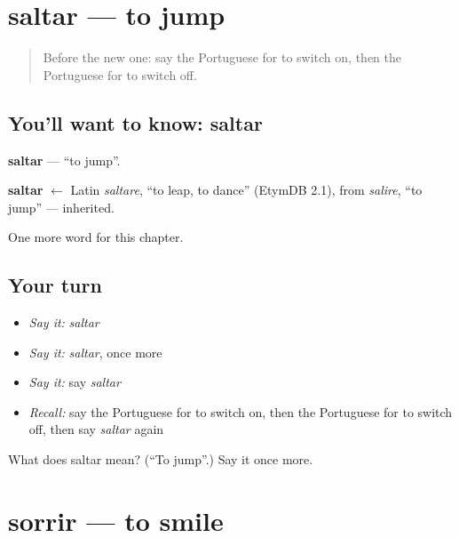 \section[saltar]{saltar — to jump}

\label{lesson:PT-C138-saltar}



\begin{quote}
Before the new one: say the Portuguese for to switch on, then the Portuguese for to switch off.
\end{quote}

\subsection*{You'll want to know: saltar}
\textbf{saltar} — \textquotedblleft{}to jump\textquotedblright{}.

\begin{cousinweb}
\textbf{saltar} $\leftarrow$ Latin \emph{saltare}, \textquotedblleft{}to leap, to dance\textquotedblright{} (EtymDB 2.1), from \emph{salire}, \textquotedblleft{}to jump\textquotedblright{} — inherited.
\end{cousinweb}

\begin{grammarlens}[title={What you've built}]
One more word for this chapter.
\end{grammarlens}

\subsection*{Your turn}
\begin{itemize}
\raggedright
  \item \emph{Say it:} \emph{saltar}
  \item \emph{Say it:} \emph{saltar}, once more
  \item \emph{Say it:} say \emph{saltar}
  \item \emph{Recall:} say the Portuguese for to switch on, then the Portuguese for to switch off, then say \emph{saltar} again
\end{itemize}

\begin{tcolorbox}[breakable,colback=teal!4,colframe=teal!35!black,title={Before you move on}]
What does saltar mean? (\textquotedblleft{}To jump\textquotedblright{}.) Say it once more.
\end{tcolorbox}
\section[sorrir]{sorrir — to smile}


